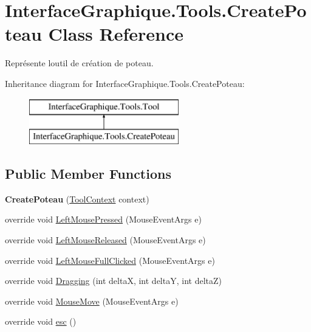 \hypertarget{class_interface_graphique_1_1_tools_1_1_create_poteau}{}\section{Interface\+Graphique.\+Tools.\+Create\+Poteau Class Reference}
\label{class_interface_graphique_1_1_tools_1_1_create_poteau}


Représente l\textquotesingle{}outil de création de poteau.  


Inheritance diagram for Interface\+Graphique.\+Tools.\+Create\+Poteau\+:\begin{figure}[H]
\begin{center}
\leavevmode
\includegraphics[height=2.000000cm]{class_interface_graphique_1_1_tools_1_1_create_poteau}
\end{center}
\end{figure}
\subsection*{Public Member Functions}
\begin{DoxyCompactItemize}
\item 
\hypertarget{class_interface_graphique_1_1_tools_1_1_create_poteau_a6828c36c0aaa7d27292254045a1b58f2}{}{\bfseries Create\+Poteau} (\hyperlink{class_interface_graphique_1_1_tools_1_1_tool_context}{Tool\+Context} context)\label{class_interface_graphique_1_1_tools_1_1_create_poteau_a6828c36c0aaa7d27292254045a1b58f2}

\item 
override void \hyperlink{class_interface_graphique_1_1_tools_1_1_create_poteau_a2e2251d85bed79c7b240fc3eb72a29be}{Left\+Mouse\+Pressed} (Mouse\+Event\+Args e)
\item 
override void \hyperlink{class_interface_graphique_1_1_tools_1_1_create_poteau_a1ddd68f567ccb4b8fc5fb06693ec85b1}{Left\+Mouse\+Released} (Mouse\+Event\+Args e)
\item 
override void \hyperlink{class_interface_graphique_1_1_tools_1_1_create_poteau_a659960f2f85f7ff0ff64bd06d2e7cf9c}{Left\+Mouse\+Full\+Clicked} (Mouse\+Event\+Args e)
\item 
override void \hyperlink{class_interface_graphique_1_1_tools_1_1_create_poteau_a30dcd71c461a1afc6fd4dd95c0e2a0ee}{Dragging} (int delta\+X, int delta\+Y, int delta\+Z)
\item 
override void \hyperlink{class_interface_graphique_1_1_tools_1_1_create_poteau_a11cb39fe881af64c1be87c44cc1c8306}{Mouse\+Move} (Mouse\+Event\+Args e)
\item 
override void \hyperlink{class_interface_graphique_1_1_tools_1_1_create_poteau_a523af264dfe1487c08d1d73b309a1095}{esc} ()
\end{DoxyCompactItemize}
